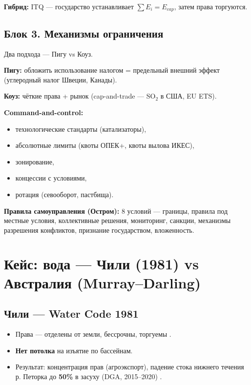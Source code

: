 \documentclass[12pt]{article}
\begin{document}
\textbf{Гибрид:} ITQ — государство устанавливает $\sum E_i = E_{cap}$, затем права торгуются.

\subsection{Блок 3. Механизмы ограничения}
Два подхода — Пигу vs Коуз.

\textbf{Пигу:} обложить использование налогом = предельный внешний эффект (углеродный налог Швеции, Канады).

\textbf{Коуз:} чёткие права + рынок (cap-and-trade — $\text{SO}_2$ в США, EU ETS).

\textbf{Command-and-control:}
\begin{itemize}
\item технологические стандарты (катализаторы),
\item абсолютные лимиты (квоты ОПЕК+, квоты вылова ИКЕС),
\item зонирование,
\item концессии с условиями,
\item ротация (севооборот, пастбища).
\end{itemize}

\textbf{Правила самоуправления (Остром):} 8 условий — границы, правила под местные условия, коллективные решения, мониторинг, санкции, механизмы разрешения конфликтов, признание государством, вложенность.

\section{Кейс: вода — Чили (1981) vs Австралия (Murray--Darling)}

\subsection{Чили — Water Code 1981}
\begin{itemize}
\item Права — отделены от земли, бессрочны, торгуемы \cite{bauer2004chile}.
\item \textbf{Нет потолка} на изъятие по бассейнам.
\item Результат: концентрация прав (агроэкспорт), падение стока нижнего течения р. Петорка до \textbf{50\%} в засуху (DGA, 2015–2020) \cite{budds2008water}.
\end{itemize}
\end{document}
